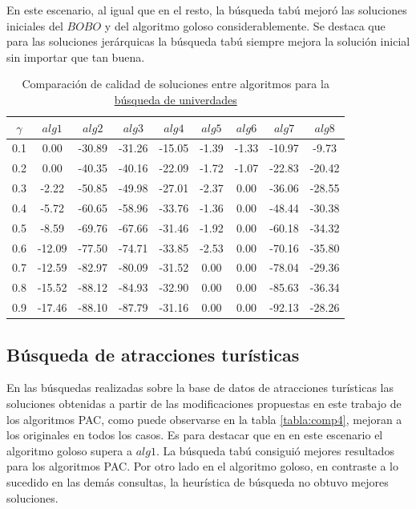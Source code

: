 En este escenario, al igual que en el resto, la búsqueda tabú mejoró las soluciones iniciales del $BOBO$ y del algoritmo goloso considerablemente. Se destaca que para las soluciones jerárquicas la búsqueda tabú siempre mejora la solución inicial sin importar que tan buena.
\begin{table}[H]
\begin{center}
\begin{tabular}{|c|c|c|c|c|c|c|c|c|}
\hline
$\gamma$&$alg1$&$alg2$&$alg3$&$alg4$&$alg5$&$alg6$&$alg7$&$alg8$ \\ \hline
0.1 & 0.00 & -30.89 & -31.26 & -15.05 & -1.39 & -1.33 & -10.97 & -9.73 \\
0.2 & 0.00 & -40.35 & -40.16 & -22.09 & -1.72 & -1.07 & -22.83 & -20.42 \\
0.3 & -2.22 & -50.85 & -49.98 & -27.01 & -2.37 & 0.00 & -36.06 & -28.55 \\
0.4 & -5.72 & -60.65 & -58.96 & -33.76 & -1.36 & 0.00 & -48.44 & -30.38 \\
0.5 & -8.59 & -69.76 & -67.66 & -31.46 & -1.92 & 0.00 & -60.18 & -34.32 \\
0.6 & -12.09 & -77.50 & -74.71 & -33.85 & -2.53 & 0.00 & -70.16 & -35.80 \\
0.7 & -12.59 & -82.97 & -80.09 & -31.52 & 0.00 & 0.00 & -78.04 & -29.36 \\
0.8 & -15.52 & -88.12 & -84.93 & -32.90 & 0.00 & 0.00 & -85.63 & -36.34 \\
0.9 & -17.46 & -88.10 & -87.79 & -31.16 & 0.00 & 0.00 & -92.13 & -28.26 \\
 \hline 
\end{tabular}
\caption{Comparación de calidad de soluciones entre algoritmos para la \hyperref[busqueda:universidades]{búsqueda de univerdades}} 
\label{tabla:comp3}
\end{center}
\end{table}

\subsection{Búsqueda de atracciones turísticas}\label{res:busAtracciones}
En las búsquedas realizadas sobre la base de datos de atracciones turísticas las soluciones obtenidas a partir de las modificaciones propuestas en este trabajo de los algoritmos PAC, como puede observarse en la tabla \ref{tabla:comp4}, mejoran a los originales en todos los casos. Es para destacar que en en este escenario el algoritmo goloso supera a $alg1$. La búsqueda tabú consiguió mejores resultados para los algoritmos PAC. Por otro lado en el algoritmo goloso, en contraste a lo sucedido en las demás consultas, la heurística de búsqueda no obtuvo mejores soluciones.

